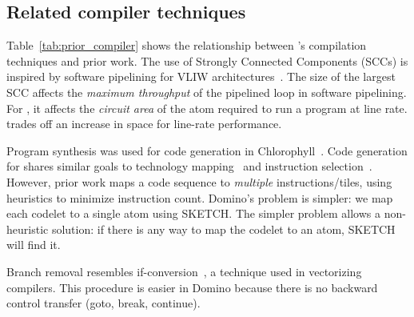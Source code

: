\subsection{Related compiler techniques}
\label{ss:related_compiler}
Table~\ref{tab:prior_compiler} shows the relationship between \pktlanguage's
compilation techniques and prior work. The use of Strongly Connected Components
(SCCs) is inspired by software pipelining for VLIW
architectures~\cite{software_pipelining}. The size of the largest SCC affects
the {\em maximum throughput} of the pipelined loop in software pipelining. For
\pktlanguage, it affects the {\em circuit area} of the atom required to run a
program at line rate. \pktlanguage trades off an increase in space for
line-rate performance.

Program synthesis was used for code generation in
Chlorophyll~\cite{chlorophyll}.  Code generation for \pktlanguage shares
similar goals to technology mapping~\cite{micheli} and
instruction selection~\cite{muchnik}.  However, prior work maps a code sequence
to \textit{multiple} instructions/tiles, using heuristics to minimize
instruction count. Domino's problem is simpler: we map each codelet to a single
atom using SKETCH.  The simpler problem allows a non-heuristic solution: if
there is any way to map the codelet to an atom, SKETCH will find it.

Branch removal resembles if-conversion~\cite{if_conversion}, a
technique used in vectorizing compilers. This procedure is easier in Domino
because there is no backward control transfer (goto, break,
continue).

